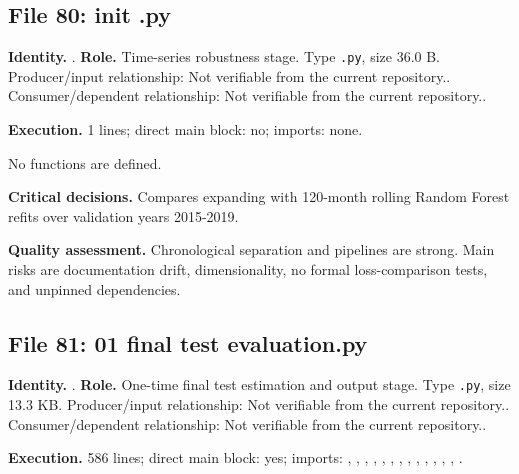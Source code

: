\documentclass[
  11pt,
  a4paper]{article}
\newcounter{none} %
\begin{document}
\subsection{File 80: init .py}\label{file-9211790446964004412}

\textbf{Identity.} .
\textbf{Role.} Time-series robustness stage. Type \texttt{.py}, size
36.0 B. Producer/input relationship: Not verifiable from the current
repository.. Consumer/dependent relationship: Not verifiable from the
current repository..

\textbf{Execution.} 1 lines; direct main block: no; imports: none.

No functions are defined.

\textbf{Critical decisions.} Compares expanding with 120-month rolling
Random Forest refits over validation years 2015-2019.

\textbf{Quality assessment.} Chronological separation and pipelines are
strong. Main risks are documentation drift, dimensionality, no formal
loss-comparison tests, and unpinned dependencies.

\subsection{File 81: 01 final test
evaluation.py}\label{file-8734457262935876876}

\textbf{Identity.}
.
\textbf{Role.} One-time final test estimation and output stage. Type
\texttt{.py}, size 13.3 KB. Producer/input relationship: Not verifiable
from the current repository.. Consumer/dependent relationship: Not
verifiable from the current repository..

\textbf{Execution.} 586 lines; direct main block: yes; imports:
, , ,
,
,
,
,
,
,
,
,
,
,
.
\end{document}
